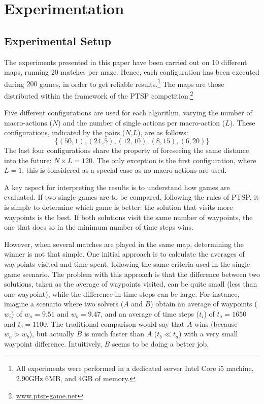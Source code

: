 \documentclass{sig-alternate}
\begin{document}
\section{Experimentation} \label{sec:exp}

\subsection{Experimental Setup} \label{sec:setup}

The experiments presented in this paper have been carried out on 10 different maps, running 20 matches per maze. Hence, each configuration has been executed during $200$ games, in order to get reliable results.\footnote{All experiments were performed in a dedicated server Intel Core i5 machine, 2.90GHz 6MB, and 4GB of memory.} The maps are those distributed within the framework of the PTSP competition.\footnote{\url{www.ptsp-game.net}} 

Five different configurations are used for each algorithm, varying the number of macro-actions ($N$) and the number of single actions per macro-action ($L$). These configurations, indicated by the pairs ($N$,$L$), are as follows: \[\{(50,1),(24,5),(12,10),(8,15),(6,20)\}\] The last four configurations share the property of foreseeing the same distance into the future: $N \times L = 120$. The only exception is the first configuration, where $L=1$, this is considered as a special case as no macro-actions are used.

A key aspect for interpreting the results is to understand how games are evaluated. If two single games are to be compared, following the rules of PTSP, it is simple to determine which game is better: the solution that visits more waypoints is the best. If both solutions visit the same number of waypoints, the one that does so in the minimum number of time steps wins.

However, when several matches are played in the same map, determining the winner is not that simple. One initial approach is to calculate the averages of waypoints visited and time spent, following the same criteria used in the single game scenario. The problem with this approach is that the difference between two solutions, taken as the average of waypoints visited, can be quite small (less than one waypoint), while the difference in time steps can be large. For instance, imagine a scenario where two solvers ($A$ and $B$) obtain an average of waypoints ($w_i$) of $w_a=9.51$ and $w_b=9.47$, and an average of time steps ($t_i$) of $t_a=1650$ and $t_b=1100$. The traditional comparison would say that $A$ wins (because $w_a>w_b$), but actually $B$ is much faster than $A$ ($t_b \ll t_a$) with a very small waypoint difference. Intuitively, $B$ seems to be doing a better job.
\end{document}
